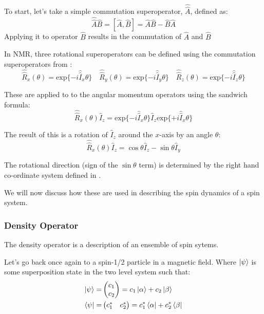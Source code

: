 To start, let's take a simple commutation superoperator, $\hat{\hat{A}}$, defined as:
\begin{equation}
  \hat{\hat{A}}\hat{B} = [\hat{A},\hat{B}] = \hat{A}\hat{B} - \hat{B}\hat{A}
\end{equation}
Applying it to operator $\hat{B}$ results in the commutation of $\hat{A}$ and $\hat{B}$

In NMR, three rotational superoperators can be defined using the commutation superoperators from :
\begin{equation}
 \hat{\hat{R}}_x(\theta) = \text{exp}\{-i\hat{\hat{I}}_x\theta\}\quad\hat{\hat{R}}_y(\theta) = \text{exp}\{-i\hat{\hat{I}}_y\theta\}\quad\hat{\hat{R}}_z(\theta) = \text{exp}\{-i\hat{\hat{I}}_z\theta\}
\end{equation}

These are applied to to the angular momentum operators using the sandwich formula:
\begin{equation}
  \hat{\hat{R}}_x(\theta)\hat{I}_z = \text{exp}\{-i\hat{\hat{I}}_x\theta\}\hat{I}_z\text{exp}\{+i\hat{\hat{I}}_x\theta\}
\end{equation}

The result of this is a rotation of $\hat{I}_z$ around the $x$-axis by an angle $\theta$:
\begin{equation}
  \hat{\hat{R}}_x(\theta)\hat{I}_z = \cos{\theta}\hat{I}_z - \sin{\theta}\hat{I}_y
\end{equation}

The rotational direction (sign of the $\sin{\theta}$ term) is determined by the right hand co-ordinate system defined in .

We will now discuss how these are used in describing the spin dynamics of a spin system.

\subsubsection{Density Operator}

The density operator is a description of an ensemble of spin sytems.

Let's go back once again to a spin-1/2 particle in a magnetic field. Where $\ket{\psi}$ is some superposition state in the two level system such that:
\begin{align}
\ket{\psi} =& \begin{pmatrix}
    c_1\\
    c_2
\end{pmatrix} = c_1\ket{\alpha} + c_2\ket{\beta}\\
\bra{\psi} =& \begin{pmatrix}
  c_1^* & c_2^*
\end{pmatrix} = c_1^*\bra{\alpha} + c_2^*\bra{\beta}
\end{align}


